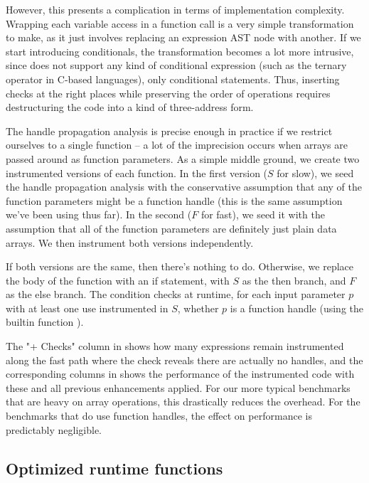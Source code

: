 However, this presents a complication in terms of implementation complexity.
Wrapping each variable access in a function call is a very simple
transformation to make, as it just involves replacing an expression AST node
with another. If we start introducing conditionals, the transformation becomes
a lot more intrusive, since \matlab does not support any kind of conditional
expression (such as the ternary \code{\?:} operator in C-based languages), only
conditional statements. Thus, inserting checks at the right places while
preserving the order of operations requires destructuring the code into a kind
of three-address form.

The handle propagation analysis is precise enough in practice if we restrict
ourselves to a single function -- a lot of the imprecision occurs when arrays
are passed around as function parameters. As a simple middle ground, we create
two instrumented versions of each function. In the first version ($S$ for
slow), we seed the handle propagation analysis with the conservative assumption
that any of the function parameters might be a function handle (this is the
same assumption we've been using thus far). In the second ($F$ for fast), we
seed it with the assumption that all of the function parameters are definitely
just plain data arrays. We then instrument both versions independently.

If both versions are the same, then there's nothing to do. Otherwise, we
replace the body of the function with an if statement, with $S$ as the then
branch, and $F$ as the else branch. The condition checks at runtime, for each
input parameter $p$ with at least one use instrumented in $S$, whether $p$
is a function handle (using the \matlab builtin function ).

The "+ Checks" column in 
shows how many expressions remain instrumented along the fast path where the
check reveals there are actually no handles, and the corresponding columns in
 shows the performance of the instrumented
code with these and all previous enhancements applied. For our more typical
\matlab benchmarks that are heavy on array operations, this drastically reduces
the overhead. For the benchmarks that do use function handles, the effect on
performance is predictably negligible.

\subsection{Optimized runtime functions}

